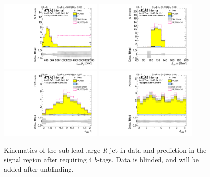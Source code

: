 \begin{figure}[htbp!]
\begin{center}
\includegraphics[angle=270, width=0.45\textwidth]{./figures/boosted/Signal/b77_FourTag_Signal_sublHCand_Pt_m_blind.pdf}
\includegraphics[angle=270, width=0.45\textwidth]{./figures/boosted/Signal/b77_FourTag_Signal_sublHCand_Mass_s_blind.pdf}\\
\includegraphics[angle=270, width=0.45\textwidth]{./figures/boosted/Signal/b77_FourTag_Signal_sublHCand_Eta_blind.pdf}
\includegraphics[angle=270, width=0.45\textwidth]{./figures/boosted/Signal/b77_FourTag_Signal_sublHCand_Phi_blind.pdf}
  \caption{Kinematics of the sub-lead large-$R$ jet in data and prediction in the signal region after requiring 4 $b$-tags. Data is blinded, and will be added after unblinding.}
  \label{fig:boosted-4b-signal-blind-ak10-subl}
\end{center}
\end{figure}

